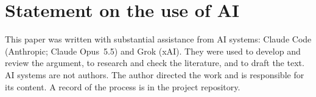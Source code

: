 \section*{Statement on the use of AI}

This paper was written with substantial assistance from AI systems: Claude Code
(Anthropic; Claude Opus~5.5) and Grok (xAI). They were used to develop and review the argument,
to research and check the literature, and to draft the text. AI systems are not authors. The
author directed the work and is responsible for its content. A record of the process is in the
project repository.
